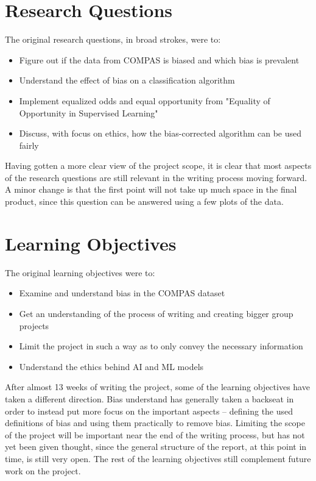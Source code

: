 \documentclass[11pt, fleqn]{article}
\begin{document}
	\section*{Research Questions}
	The original research questions, in broad strokes, were to:
	\begin{itemize}
		\itemsep-0.1cm
		\item Figure out if the data from COMPAS is biased and which bias is prevalent
		
		\item Understand the effect of bias on a classification algorithm
		
		\item Implement equalized odds and equal opportunity from "Equality of Opportunity in Supervised Learning"
		
		\item Discuss, with focus on ethics, how the bias-corrected algorithm can be used fairly
	\end{itemize}
	
	Having gotten a more clear view of the project scope, it is clear that most aspects of the research questions are still relevant in the writing process moving forward. A minor change is that the first point will not take up much space in the final product, since this question can be answered using a few plots of the data.
	
	\section*{Learning Objectives}
	The original learning objectives were to:
	\begin{itemize}
		\itemsep-0.1cm
		\item Examine and understand bias in the COMPAS dataset
		\item Get an understanding of the process of writing and creating bigger group projects
		\item Limit the project in such a way as to only convey the necessary information
		\item Understand the ethics behind AI and ML models
	\end{itemize}
	
	After almost 13 weeks of writing the project, some of the learning objectives have taken a different direction. Bias understand has generally taken a backseat in order to instead put more focus on the important aspects – defining the used definitions of bias and using them practically to remove bias. Limiting the scope of the project will be important near the end of the writing process, but has not yet been given thought, since the general structure of the report, at this point in time, is still very open. The rest of the learning objectives still complement future work on the project.
	
\end{document}
